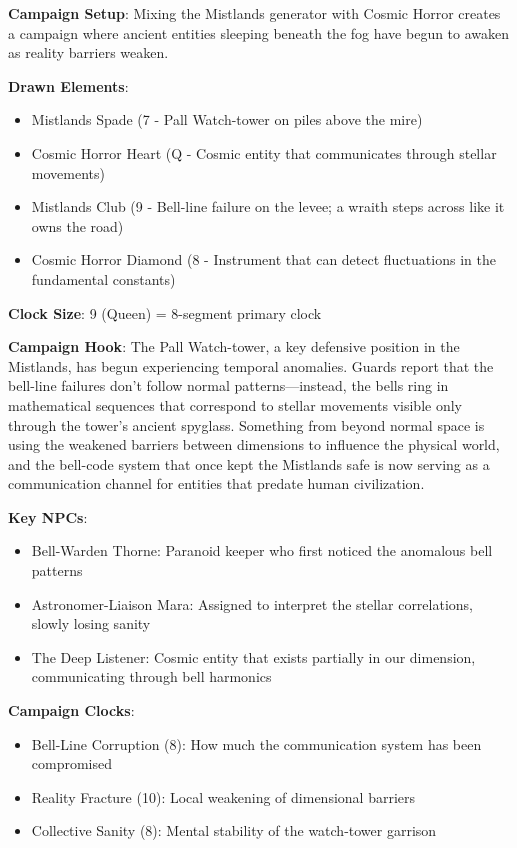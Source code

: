 \documentclass[11pt]{article}
\begin{document}
\begin{mdframed}[backgroundcolor=shadecolor]
\textbf{Campaign Setup}:
Mixing the Mistlands generator with Cosmic Horror creates a campaign where ancient entities sleeping beneath the fog have begun to awaken as reality barriers weaken.

\textbf{Drawn Elements}:
\begin{itemize}[leftmargin=*]
\item Mistlands Spade (7 - Pall Watch-tower on piles above the mire)
\item Cosmic Horror Heart (Q - Cosmic entity that communicates through stellar movements)
\item Mistlands Club (9 - Bell-line failure on the levee; a wraith steps across like it owns the road)
\item Cosmic Horror Diamond (8 - Instrument that can detect fluctuations in the fundamental constants)
\end{itemize}

\textbf{Clock Size}: 9 (Queen) = 8-segment primary clock

\textbf{Campaign Hook}:
The Pall Watch-tower, a key defensive position in the Mistlands, has begun experiencing temporal anomalies. Guards report that the bell-line failures don't follow normal patterns—instead, the bells ring in mathematical sequences that correspond to stellar movements visible only through the tower's ancient spyglass. Something from beyond normal space is using the weakened barriers between dimensions to influence the physical world, and the bell-code system that once kept the Mistlands safe is now serving as a communication channel for entities that predate human civilization.

\textbf{Key NPCs}:
\begin{itemize}[leftmargin=*]
\item Bell-Warden Thorne: Paranoid keeper who first noticed the anomalous bell patterns
\item Astronomer-Liaison Mara: Assigned to interpret the stellar correlations, slowly losing sanity
\item The Deep Listener: Cosmic entity that exists partially in our dimension, communicating through bell harmonics
\end{itemize}

\textbf{Campaign Clocks}:
\begin{itemize}[leftmargin=*]
\item Bell-Line Corruption (8): How much the communication system has been compromised
\item Reality Fracture (10): Local weakening of dimensional barriers
\item Collective Sanity (8): Mental stability of the watch-tower garrison
\end{itemize}


\end{mdframed}
\end{document}
